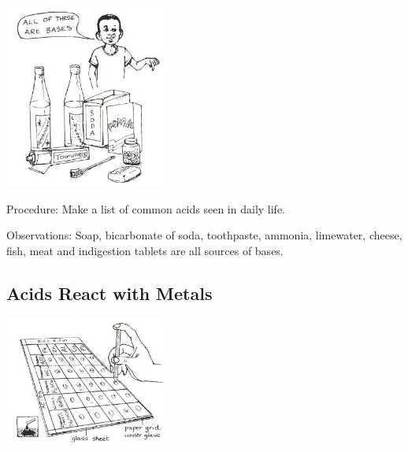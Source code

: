\begin{multicols}{2}
\begin{center}
\includegraphics[width=0.4\textwidth]{./img/source/bases-daily.jpg}
\end{center}

\begin{description*}
\item[Procedure:]{Make a list of common acids seen in daily life.}
\item[Observations:]{Soap, bicarbonate of soda, toothpaste, ammonia, limewater, cheese, fish, meat and indigestion tablets are all sources of bases.}
\end{description*}

\subsection{Acids React with Metals}

\begin{center}
\includegraphics[width=0.4\textwidth]{./img/source/acid-metals.jpg}
\end{center}


\end{multicols}
